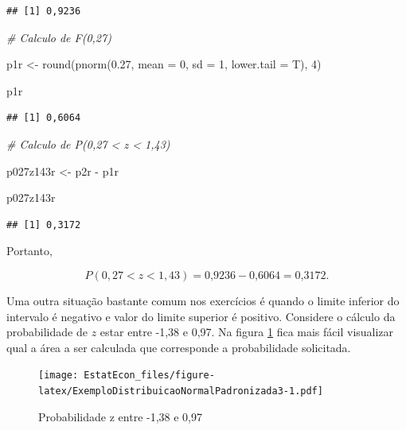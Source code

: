 \documentclass[
]{book}
\newenvironment{Shaded}{\begin{snugshade}}{\end{snugshade}}
\newcommand{\AttributeTok}[1]{\textcolor[rgb]{0.77,0.63,0.00}{#1}}
\newcommand{\CommentTok}[1]{\textcolor[rgb]{0.56,0.35,0.01}{\textit{#1}}}
\newcommand{\DecValTok}[1]{\textcolor[rgb]{0.00,0.00,0.81}{#1}}
\newcommand{\FloatTok}[1]{\textcolor[rgb]{0.00,0.00,0.81}{#1}}
\newcommand{\FunctionTok}[1]{\textcolor[rgb]{0.00,0.00,0.00}{#1}}
\newcommand{\NormalTok}[1]{#1}
\newcommand{\OtherTok}[1]{\textcolor[rgb]{0.56,0.35,0.01}{#1}}
\newcommand{\SpecialCharTok}[1]{\textcolor[rgb]{0.00,0.00,0.00}{#1}}
\begin{document}
\begin{verbatim}
## [1] 0,9236
\end{verbatim}

\begin{Shaded}
\begin{Highlighting}[]
\CommentTok{\# Calculo de F(0,27)}

\NormalTok{p1r }\OtherTok{\textless{}{-}} \FunctionTok{round}\NormalTok{(}\FunctionTok{pnorm}\NormalTok{(}\FloatTok{0.27}\NormalTok{, }\AttributeTok{mean =} \DecValTok{0}\NormalTok{, }\AttributeTok{sd =} \DecValTok{1}\NormalTok{, }\AttributeTok{lower.tail =}\NormalTok{ T), }
    \DecValTok{4}\NormalTok{)}

\NormalTok{p1r}
\end{Highlighting}
\end{Shaded}

\begin{verbatim}
## [1] 0,6064
\end{verbatim}

\begin{Shaded}
\begin{Highlighting}[]
\CommentTok{\# Calculo de P(0,27 \textless{} z \textless{} 1,43)}

\NormalTok{p027z143r }\OtherTok{\textless{}{-}}\NormalTok{ p2r }\SpecialCharTok{{-}}\NormalTok{ p1r}


\NormalTok{p027z143r}
\end{Highlighting}
\end{Shaded}

\begin{verbatim}
## [1] 0,3172
\end{verbatim}

Portanto,

\[
  P(0,27 < z < 1,43) = \text{0,9236} - \text{0,6064} = \text{0,3172}.
\]

Uma outra situação bastante comum nos exercícios é quando o limite inferior do intervalo é negativo e valor do limite superior é positivo. Considere o cálculo da probabilidade de \(z\) estar entre -1,38 e 0,97. Na figura \ref{fig:ExemploDistribuicaoNormalPadronizada3} fica mais fácil visualizar qual a área a ser calculada que corresponde a probabilidade solicitada.

\begin{figure}
\centering
\texttt{[image: EstatEcon\_files/figure-latex/ExemploDistribuicaoNormalPadronizada3-1.pdf]}
\caption{\label{fig:ExemploDistribuicaoNormalPadronizada3}Probabilidade z entre -1,38 e 0,97}
\end{figure}
\end{document}
